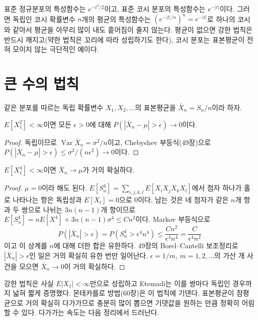 표준 정규분포의 특성함수는 $e^{-t^2/2}$이고, 표준 코시 분포의 특성함수는 $e^{-|t|}$이다. 그러면 독립인 코시 확률변수 $n$개의 평균의 특성함수는 $(e^{-|t|/n})^n=e^{-|t|}$로 하나의 코시와 같아서 평균을 아무리 많이 내도 흩어짐이 줄지 않는다. 평균이 없으면 강한 법칙은 반드시 깨지고(약한 법칙은 꼬리에 따라 성립하기도 한다), 코시 분포는 표본평균이 전혀 모이지 않는 극단적인 예이다.

\section{큰 수의 법칙}
\label{sec:lln}

같은 분포를 따르는 독립 확률변수 $X_1,X_2,\dots$의 표본평균을 $\bar X_n=S_n/n$이라 하자.

\begin{theorem}[약한 법칙]
$E[X_1^2]<\infty$이면 모든 $\epsilon>0$에 대해 $P(|\bar X_n-\mu|>\epsilon)\to0$이다.
\end{theorem}

\begin{proof}
독립이므로 $\operatorname{Var}\bar X_n=\sigma^2/n$이고, Chebyshev 부등식(49장)으로 $P(|\bar X_n-\mu|>\epsilon)\le\sigma^2/(n\epsilon^2)\to0$이다.
\end{proof}

\begin{theorem}[강한 법칙, 4차 모멘트]
\label{thm:slln4}
$E[X_1^4]<\infty$이면 $\bar X_n\to\mu$가 거의 확실하다.
\end{theorem}

\begin{proof}
$\mu=0$이라 해도 된다. $E[S_n^4]=\sum_{i,j,k,l}E[X_iX_jX_kX_l]$에서 첨자 하나가 홀로 나타나는 항은 독립성과 $E[X_i]=0$으로 $0$이다. 남는 것은 네 첨자가 같은 $n$개 항과 두 쌍으로 나뉘는 $3n(n-1)$개 항이므로 $E[S_n^4]=nE[X^4]+3n(n-1)\sigma^4\le Cn^2$이다. Markov 부등식으로
\[
P(|\bar X_n|>\epsilon)=P(S_n^4>\epsilon^4n^4)\le\frac{Cn^2}{\epsilon^4n^4}=\frac C{\epsilon^4n^2}
\]
이고 이 상계를 $n$에 대해 더한 합은 유한하다. 49장의 Borel--Cantelli 보조정리로 $|\bar X_n|>\epsilon$인 일은 거의 확실히 유한 번만 일어난다. $\epsilon=1/m$, $m=1,2,\dots$의 가산 개 사건을 모으면 $\bar X_n\to0$이 거의 확실하다.
\end{proof}

강한 법칙은 사실 $E|X_1|<\infty$만으로 성립하고 Etemadi는 이를 쌍마다 독립인 경우까지 넓혀 짧게 증명했다\cite{etemadi1981}. 몬테카를로 방법(60장)은 이 법칙에 기댄다. 표본평균이 참평균으로 거의 확실히 다가가므로 충분히 많이 뽑으면 기댓값을 원하는 만큼 정확히 어림할 수 있다. 다가가는 속도는 다음 정리에서 드러난다.

